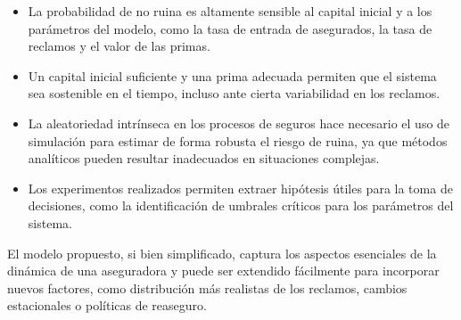 \documentclass{article}
\begin{document}
\begin{itemize}
  \item La probabilidad de no ruina es altamente sensible al capital inicial y a los parámetros del modelo, como la tasa de entrada de asegurados, la tasa de reclamos y el valor de las primas.
  \item Un capital inicial suficiente y una prima adecuada permiten que el sistema sea sostenible en el tiempo, incluso ante cierta variabilidad en los reclamos.
  \item La aleatoriedad intrínseca en los procesos de seguros hace necesario el uso de simulación para estimar de forma robusta el riesgo de ruina, ya que métodos analíticos pueden resultar inadecuados en situaciones complejas.
  \item Los experimentos realizados permiten extraer hipótesis útiles para la toma de decisiones, como la identificación de umbrales críticos para los parámetros del sistema.
\end{itemize}

El modelo propuesto, si bien simplificado, captura los aspectos esenciales de la dinámica de una aseguradora y puede ser extendido fácilmente para incorporar nuevos factores, como distribución más realistas de los reclamos, cambios estacionales o políticas de reaseguro.
\end{document}
